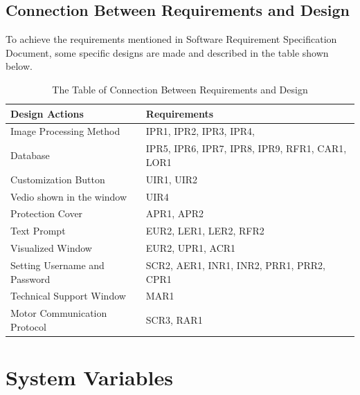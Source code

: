\documentclass[12pt, titlepage]{article}
\begin{document}
\subsection{Connection Between Requirements and Design} \label{SecConnection}

To achieve the requirements mentioned in Software Requirement Specification Document, some specific designs are made and described in the table shown below. 

\begin{table}[H]
\begin{center}
\caption {The Table of Connection Between Requirements and Design}
    \begin{tabular}{| p{8cm}| p{7cm} |}
    \hline
    \textbf{Design Actions} & \textbf{Requirements}  \\
    \hline
    Image Processing Method & IPR1, IPR2, IPR3, IPR4,  \\
    \hline
    Database  & IPR5, IPR6, IPR7, IPR8, IPR9, RFR1, CAR1, LOR1\\
    \hline
    Customization Button & UIR1, UIR2\\
    \hline
    Vedio shown in the window & UIR4\\
    \hline
    Protection Cover & APR1, APR2 \\
    \hline
    Text Prompt & EUR2, LER1, LER2, RFR2\\
    \hline
    Visualized Window & EUR2, UPR1, ACR1\\
    \hline
    Setting Username and Password & SCR2, AER1, INR1, INR2, PRR1, PRR2, CPR1\\
    \hline
    Technical Support Window & MAR1\\
    \hline
    Motor Communication Protocol & SCR3, RAR1\\
    \hline
    \end{tabular}
\end{center}
\end{table}

\section{System Variables}
\end{document}
